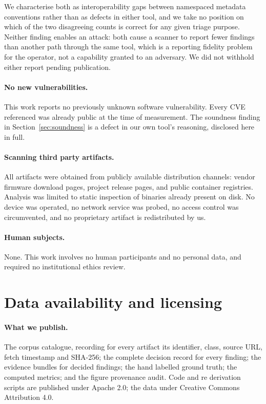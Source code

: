 We characterise both as interoperability gaps between namespaced metadata
conventions rather than as defects in either tool, and we take no position on
which of the two disagreeing counts is correct for any given triage purpose.
Neither finding enables an attack: both cause a scanner to report fewer findings
than another path through the same tool, which is a reporting fidelity problem
for the operator, not a capability granted to an adversary. We did not withhold
either report pending publication.

\paragraph{No new vulnerabilities.} This work reports no previously unknown
software vulnerability. Every CVE referenced was already public at the time of
measurement. The soundness finding in Section~\ref{sec:soundness} is a defect in
our own tool's reasoning, disclosed here in full.

\paragraph{Scanning third party artifacts.} All artifacts were obtained from
publicly available distribution channels: vendor firmware download pages, project
release pages, and public container registries. Analysis was limited to static
inspection of binaries already present on disk. No device was operated, no
network service was probed, no access control was circumvented, and no
proprietary artifact is redistributed by us.

\paragraph{Human subjects.} None. This work involves no human participants and no
personal data, and required no institutional ethics review.

\section{Data availability and licensing}
\label{sec:data}

\paragraph{What we publish.} The corpus catalogue, recording for every artifact
its identifier, class, source URL, fetch timestamp and SHA-256; the complete
decision record for every finding; the evidence bundles for decided findings; the
hand labelled ground truth; the computed metrics; and the figure provenance
audit. Code and re derivation scripts are published under Apache 2.0; the data
under Creative Commons Attribution 4.0.

